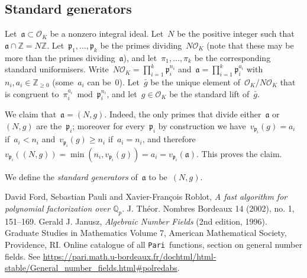 \documentclass{article}
\def\Pari{{\tt Pari}}
\def\Z{{\mathbb Z}}
\def\OO{{\mathcal O}}
\def\a{{\mathfrak a}}
\def\p{{\mathfrak p}}
\begin{document}
\subsection{Standard generators}
Let~$\a\subset\OO_K$ be a nonzero integral ideal. Let~$N$ be the positive
integer such that~$\a\cap\Z = N\Z$. Let~$\p_1,\dots,\p_k$ be the primes
dividing~$N\OO_K$ (note that these may be more than the primes dividing~$\a$),
and let~$\pi_1,\dots,\pi_k$ be the corresponding standard uniformisers.
Write~$N\OO_K = \prod_{i=1}^k\p_i^{n_i}$ and~$\a = \prod_{i=1}^k\p_i^{a_i}$
with~$n_i,a_i\in\Z_{\ge 0}$ (some~$a_i$ can be~$0$). Let~$\bar{g}$ be the unique
element of~$\OO_K/N\OO_K$ that is congruent to~$\pi_i^{a_i} \bmod{\p_i^{n_i}}$,
and let~$g\in\OO_K$ be the standard lift of~$\bar{g}$.

We claim that~$\a = (N,g)$. Indeed, the only primes that divide either~$\a$
or~$(N,g)$ are the~$\p_i$; moreover for every~$\p_i$ by construction we have~$v_{\p_i}(g)=
a_i$ if~$a_i<n_i$ and~$v_{\p_i}(g)\ge n_i$ if~$a_i=n_i$, and
therefore~$v_{\p_i}((N,g)) = \min(n_i,v_{\p_i}(g)) = a_i = v_{\p_i}(\a)$. This proves the
claim.

We define the \emph{standard generators} of~$\a$ to be~$(N,g)$.




\begin{thebibliography}{10}
 David Ford, Sebastian Pauli and Xavier-Fran\c cois Roblot, {\em
  A fast algorithm for polynomial factorization over $\mathbb{Q}_p$}. J.
  Th\'eor. Nombres Bordeaux 14 (2002), no. 1, 151--169.
 Gerald J. Janusz, {\em Algebraic Number Fields} (2nd
  edition, 1996).  Graduate Studies in Mathematics Volume 7, American
  Mathematical Society, Providence, RI.
 Online catalogue of all \Pari\ functions, section
  on general number fields.  See
  \href{https://pari.math.u-bordeaux.fr/dochtml/html-stable/General_number_fields.html\#polredabs}{\url{https://pari.math.u-bordeaux.fr/dochtml/html-stable/General_number_fields.html\#polredabs}}.
\end{thebibliography}
\end{document}
